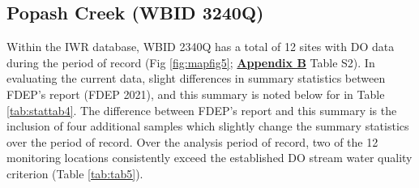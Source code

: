 \documentclass[]{interact}
\theoremstyle{plain}%
\theoremstyle{definition}
\theoremstyle{remark}
\begin{document}
\hypertarget{popash-creek-wbid-3240q}{%
\subsection{Popash Creek (WBID 3240Q)}\label{popash-creek-wbid-3240q}}

Within the IWR database, WBID 2340Q has a total of 12 sites with DO data
during the period of record (Fig \ref{fig:mapfig5};
\textbf{\protect\hyperlink{appendix-b}{Appendix B}} Table S2). In
evaluating the current data, slight differences in summary statistics
between FDEP's report (FDEP 2021), and this summary is noted below for
in Table \ref{tab:stattab4}. The difference between FDEP's report and
this summary is the inclusion of four additional samples which slightly
change the summary statistics over the period of record. Over the
analysis period of record, two of the 12 monitoring locations
consistently exceed the established DO stream water quality criterion
(Table \ref{tab:tab5}).

\begin{table}[H]

\caption{\label{tab:table2}\label{tab:stattab4} Summary statisic of dissolved oxygen (DO) saturation for Popash Creek (WBID 3240Q) during the period of record (Calendar Year: 2006 - 2020) as reported by FDEP (2021) and summaried data (this report)}
\centering
{}
\end{table}
\end{document}
